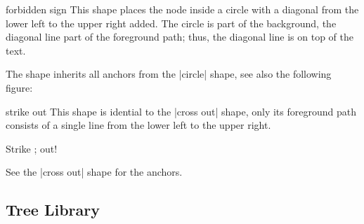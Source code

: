 \begin{shape}{forbidden sign}
  This shape places the node inside a circle with a diagonal from the
  lower left to the upper right added. The circle is part of the
  background, the diagonal line part of the foreground path; thus, the
  diagonal line is on top of the text.
  
\begin{codeexample}[]
\end{codeexample}

  The shape inherits all anchors from the |circle| shape, see also the
  following figure:
\begin{codeexample}[]
\Huge
{}
\end{codeexample}
\end{shape}


\begin{shape}{strike out}
  This shape is idential to the |cross out| shape, only its foreground
  path consists of a single line from the lower left to the upper
  right.
  
\begin{codeexample}[]
Strike \tikz[baseline] ; out!  
\end{codeexample}

  See the |cross out| shape for the anchors.
\end{shape}



\subsection{Tree Library}

\label{section-tree-library}


